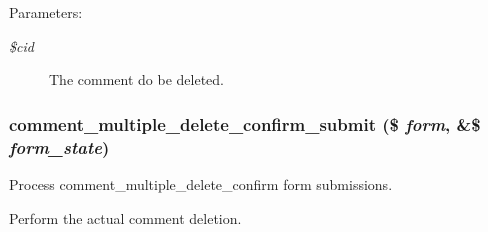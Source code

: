 \begin{Desc}
\item[Parameters:]
\begin{description}
\item[{\em \$cid}]The comment do be deleted. \end{description}
\end{Desc}
\hypertarget{comment_8admin_8inc_0995d69b00481eb46c1981112df0999f}{
\subsubsection[{comment\_\-multiple\_\-delete\_\-confirm\_\-submit}]{\setlength{\rightskip}{0pt plus 5cm}comment\_\-multiple\_\-delete\_\-confirm\_\-submit (\$ {\em form}, \/  \&\$ {\em form\_\-state})}}
\label{comment_8admin_8inc_0995d69b00481eb46c1981112df0999f}


Process comment\_\-multiple\_\-delete\_\-confirm form submissions.

Perform the actual comment deletion. 